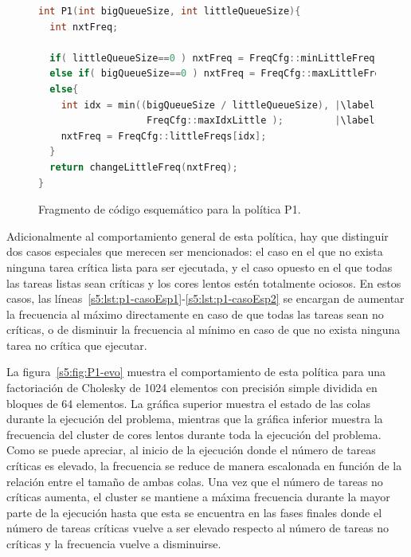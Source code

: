 \begin{figure}
  \centering

  \begin{lstlisting}[language=C++]
int P1(int bigQueueSize, int littleQueueSize){
  int nxtFreq;
      
  if( littleQueueSize==0 ) nxtFreq = FreqCfg::minLittleFreq; |\label{s5:lst:p1-casoEsp1}|
  else if( bigQueueSize==0 ) nxtFreq = FreqCfg::maxLittleFreq; |\label{s5:lst:p1-casoEsp2}|
  else{
    int idx = min((bigQueueSize / littleQueueSize), |\label{s5:lst:p1-calculoPrincipal(a)}|
                   FreqCfg::maxIdxLittle );         |\label{s5:lst:p1-calculoPrincipal(b)}|
    nxtFreq = FreqCfg::littleFreqs[idx];
  }
  return changeLittleFreq(nxtFreq);
}
\end{lstlisting}

  \caption[Fragmento de código esquemático para la política P1]
  {Fragmento de código esquemático para la política P1.}
  \label{s5:fig:listing-p1}
\end{figure}

Adicionalmente al comportamiento general de esta política, hay que
distinguir dos casos especiales que merecen ser mencionados: el caso en el
que no exista ninguna tarea crítica lista para ser ejecutada, y el caso
opuesto en el que todas las tareas listas sean críticas y los cores lentos
estén totalmente ociosos. En estos casos, las
líneas~\ref{s5:lst:p1-casoEsp1}-\ref{s5:lst:p1-casoEsp2} se encargan de
aumentar la frecuencia al máximo directamente en caso de que todas las
tareas sean no críticas, o de disminuir la frecuencia al mínimo en caso de
que no exista ninguna tarea no crítica que ejecutar.

La figura~\ref{s5:fig:P1-evo} muestra el comportamiento de esta política
para una factoriación de Cholesky de 1024 elementos con precisión simple
dividida en bloques de 64 elementos. La gráfica superior muestra el estado
de las colas durante la ejecución del problema, mientras que la gráfica
inferior muestra la frecuencia del cluster de cores lentos durante toda la
ejecución del problema. Como se puede apreciar, al inicio de la ejecución
donde el número de tareas críticas es elevado, la frecuencia se reduce de
manera escalonada en función de la relación entre el tamaño de ambas
colas. Una vez que el número de tareas no críticas aumenta, el cluster se
mantiene a máxima frecuencia durante la mayor parte de la ejecución hasta
que esta se encuentra en las fases finales donde el número de tareas
críticas vuelve a ser elevado respecto al número de tareas no críticas y la
frecuencia vuelve a disminuirse.

